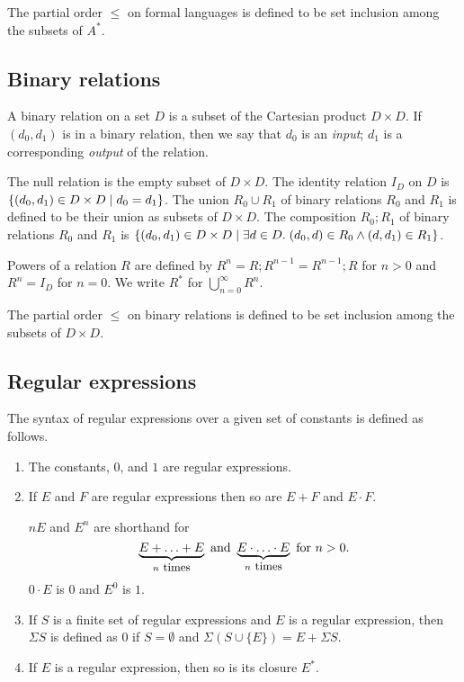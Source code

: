 \documentclass[preprint,11pt]{elsarticle}
\begin{document}
The partial order $\leq$ on formal languages is defined
to be set inclusion among the subsets of $A^*$.

\subsection{Binary relations}
A binary relation on a set $D$ is a subset of
the Cartesian product $D \times D$.
If $(d_0,d_1)$ is in a binary relation,
then we say that $d_0$ is an \emph{input};
$d_1$ is a corresponding \emph{output} of the relation.

The null relation is the empty subset of $D \times D$.
The identity relation $I_D$ on $D$
is $\{(d_0,d_1) \in D \times D \mid d_0 = d_1\}$. 
The union $R_0 \cup R_1$ of binary relations
$R_0$ and $R_1$  is defined to be
their union as subsets of $D \times D$.
The composition $R_0;R_1$ of binary relations
$R_0$ and $R_1$
is $\{(d_0,d_1) \in D \times D \mid \exists d \in D.\; (d_0,d) \in R_0 \wedge (d,d_1) \in R_1\} $. 

Powers of a relation $R$ are defined by
$R^n = R;R^{n-1} = R^{n-1};R$ for $n>0$
and $R^n = I_D$ for $n=0$.
We write $R^*$ for $\bigcup_{n=0}^\infty R^n$.

The partial order $\leq$ on binary relations is defined
to be set inclusion among the subsets of $D\times D$.

\subsection{Regular expressions}

The syntax of regular expressions \cite{prr90}
over a given set of constants is
defined as follows.
\begin{enumerate}
\item
The constants, $0$, and $1$ are regular expressions.
\item
If $E$ and $F$ are regular expressions
then so are $E + F$ and
$E\cdot F$.

$nE$ and $E^n$ are shorthand for
\[
\underbrace{E+\ldots+E}_{n \mbox{ {\small times}}}
\mbox{ and }
\underbrace{E\cdot\ldots\cdot E}_{n \mbox{ {\small times}}}
\mbox{ for } n > 0.
\]
$0\cdot E$ is $0$ and $E^0$ is $1$.
\item
If $S$ is a finite set of regular expressions
and $E$ is a regular expression,
then $\Sigma S$ is defined as
$0$ if $S = \emptyset$
and
$
\Sigma (S \cup \{E\})
=
E+\Sigma S
$.
\item
If $E$ is a regular expression,
then so is its closure $E^*$.
\end{enumerate}
\end{document}
